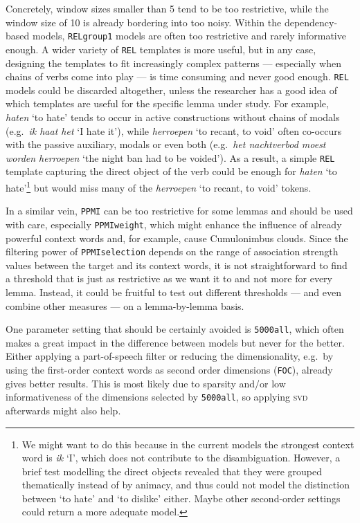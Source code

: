 \documentclass[
]{book}
\begin{document}
Concretely, window sizes smaller than 5 tend to be too restrictive, while the window size of 10 is already bordering into too noisy. Within the dependency-based models, \texttt{RELgroup1} models are often too restrictive and rarely informative enough. A wider variety of \texttt{REL} templates is more useful, but in any case, designing the templates to fit increasingly complex patterns --- especially when chains of verbs come into play --- is time consuming and never good enough. \texttt{REL} models could be discarded altogether, unless the researcher has a good idea of which templates are useful for the specific lemma under study. For example, \emph{haten} `to hate' tends to occur in active constructions without chains of modals (e.g.~\emph{ik haat het} `I hate it'), while \emph{herroepen} `to recant, to void' often co-occurs with the passive auxiliary, modals or even both (e.g.~\emph{het nachtverbod moest worden herroepen} `the night ban had to be voided'). As a result, a simple \texttt{REL} template capturing the direct object of the verb could be enough for \emph{haten} `to hate'\footnote{We might want to do this because in the current models the strongest context word is \emph{ik} `I', which does not contribute to the disambiguation. However, a brief test modelling the direct objects revealed that they were grouped thematically instead of by animacy, and thus could not model the distinction between `to hate' and `to dislike' either. Maybe other second-order settings could return a more adequate model.} but would miss many of the \emph{herroepen} `to recant, to void' tokens.

In a similar vein, \texttt{PPMI} can be too restrictive for some lemmas and should be used with care, especially \texttt{PPMIweight}, which might enhance the influence of already powerful context words and, for example, cause Cumulonimbus clouds. Since the filtering power of \texttt{PPMIselection} depends on the range of association strength values between the target and its context words, it is not straightforward to find a threshold that is just as restrictive as we want it to and not more for every lemma. Instead, it could be fruitful to test out different thresholds --- and even combine other measures --- on a lemma-by-lemma basis.

One parameter setting that should be certainly avoided is \texttt{5000all}, which often makes a great impact in the difference between models but never for the better. Either applying a part-of-speech filter or reducing the dimensionality, e.g.~by using the first-order context words as second order dimensions (\texttt{FOC}), already gives better results. This is most likely due to sparsity and/or low informativeness of the dimensions selected by \texttt{5000all}, so applying \textsc{svd} afterwards might also help.
\end{document}
